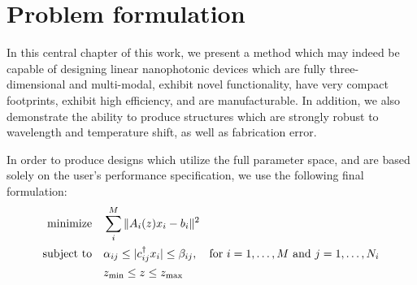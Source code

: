 \section{Problem formulation}
In this central chapter of this work, 
    we present a method which may indeed be capable of designing 
    linear nanophotonic devices which
    are fully three-dimensional and multi-modal,
    exhibit novel functionality,
    have very compact footprints,
    exhibit high efficiency, and
    are manufacturable.
In addition, we also demonstrate the ability to produce structures
    which are strongly robust to wavelength and temperature shift,
    as well as fabrication error.

In order to produce designs which utilize the full parameter space,
    and are based solely on the user's performance specification,
    we use the following final formulation:
\begin{subequations}\begin{align}
    \operatorname*{\text{minimize}\quad} & \sum_i^M \|A_i(z)x_i - b_i\|^2 \\
    \text{subject to}\quad & \alpha_{ij} \le |c_{ij}^\dagger x_i| \le \beta_{ij}, \quad
        \text{for $i = 1, \ldots, M$ and $j = 1, \ldots, N_i$} \\
        &   z_\text{min} \le z \le z_\text{max}
\end{align} \label{problem}\end{subequations}

